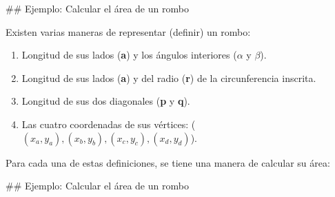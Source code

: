 ## Ejemplo: Calcular el área de un rombo

Existen varias maneras de representar (definir) un rombo:
\begin{enumerate}
    \footnotesize
    \item Longitud de sus lados (\textbf{a}) y los ángulos interiores ($\alpha$ y $\beta$).
    \item Longitud de sus lados (\textbf{a}) y del radio (\textbf{r}) de la circunferencia inscrita.
    \item \alert<2->{Longitud de sus dos diagonales (\textbf{p} y \textbf{q})}.
    \item Las cuatro coordenadas de sus vértices: (\textbf{$ (x_a, y_a), (x_b, y_b), (x_c, y_c), (x_d, y_d)$}).
\end{enumerate}

\vspace{4mm}
Para cada una de estas definiciones, se tiene una manera de calcular su área:

## Ejemplo: Calcular el área de un rombo

\vspace*{-12mm}

\bgncolumns

